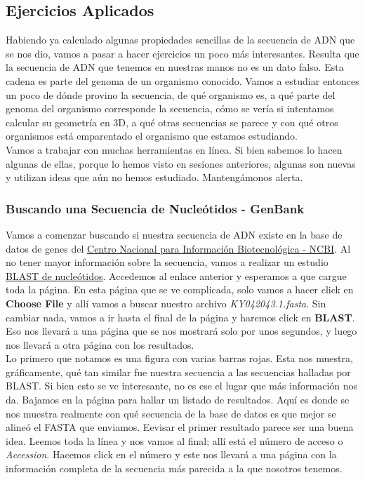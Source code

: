 \documentclass[10pt,letterpaper]{article}
\begin{document}
\subsection{Ejercicios Aplicados}
Habiendo ya calculado algunas propiedades sencillas de la secuencia de ADN que se nos dio, vamos a pasar a hacer ejercicios un poco m\'as interesantes. Resulta que la secuencia de ADN que tenemos en nuestras manos no es un dato falso. Esta cadena es parte del genoma de un organismo conocido. Vamos a estudiar entonces un poco de d\'onde provino la secuencia, de qu\'e organismo es, a qu\'e parte del genoma del organismo corresponde la secuencia, c\'omo se ver\'ia si intentamos calcular su geometr\'ia en 3D, a qu\'e otras secuencias se parece y con qu\'e otros organismos est\'a emparentado el organismo que estamos estudiando.\\

Vamos a trabajar con muchas herramientas en l\'inea. Si bien sabemos lo hacen algunas de ellas, porque lo hemos visto en sesiones anteriores, algunas son nuevas y utilizan ideas que a\'un no hemos estudiado. Manteng\'amonos alerta.

\subsubsection{Buscando una Secuencia de Nucle\'otidos - GenBank}
Vamos a comenzar buscando si nuestra secuencia de ADN existe en la base de datos de genes del  \href{https://www.ncbi.nlm.nih.gov/nuccore/}{Centro Nacional para Informaci\'on Biotecnol\'ogica - NCBI}. Al no tener mayor informaci\'on sobre la secuencia, vamos a realizar un estudio \href{https://blast.ncbi.nlm.nih.gov/Blast.cgi?PROGRAM=blastn&PAGE_TYPE=BlastSearch&LINK_LOC=blasthome}{BLAST de nucle\'otidos}. Accedemos al enlace anterior y esperamos a que cargue toda la p\'agina. En esta p\'agina que se ve complicada, solo vamos a hacer click en \textbf{Choose File} y all\'i vamos a buscar nuestro archivo \textit{KY042043.1.fasta}. Sin cambiar nada, vamos a ir hasta el final de la p\'agina y haremos click en \textbf{BLAST}. Eso nos llevar\'a a una p\'agina que se nos mostrar\'a solo por unos segundos, y luego nos llevar\'a a otra p\'agina con los resultados.\\

Lo primero que notamos es una figura con varias barras rojas. Esta nos muestra, gr\'aficamente, qu\'e tan similar fue nuestra secuencia a las secuencias halladas por BLAST. Si bien esto se ve interesante, no es ese el lugar que m\'as informaci\'on nos da. Bajamos en la p\'agina para hallar un listado de resultados. Aqu\'i es donde se nos muestra realmente con qu\'e secuencia de la base de datos es que mejor se aline\'o el FASTA que enviamos. Eevisar el primer resultado parece ser una buena idea. Leemos toda la l\'inea y nos vamos al final; all\'i est\'a el n\'umero de acceso o \emph{Accession}. Hacemos click en el n\'umero y este nos llevar\'a a una p\'agina con la informaci\'on completa de la secuencia m\'as parecida a la que nosotros tenemos.\\
\end{document}
